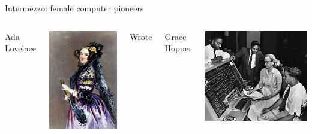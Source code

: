 \documentclass[aspectratio=169,usenames,dvipsnames]{beamer}
\begin{document}
\begin{frame}{Intermezzo: female computer pioneers}
	\begin{columns}
		Ada Lovelace %

		\vspace{1ex}
		\includegraphics[width=0.9\linewidth,trim={0 1cm 0 1cm},clip]{fig/ada}
		
		Wrote 

		\pause
		Grace Hopper %
		
		\vspace{1ex}
		\includegraphics[width=0.9\linewidth]{fig/gracehopper}


\end{columns}
\end{frame}
\end{document}
